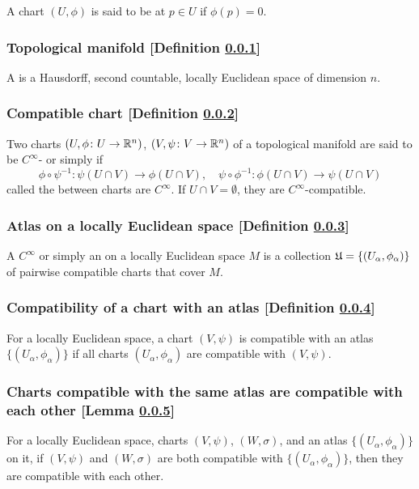 A chart $(U, \phi)$ is said to be  at $p \in U$ if $\phi(p) = 0$.

\subsubsection{Topological manifold [Definition \ref{topological-manifold}]}\label{topological-manifold}
A  is a Hausdorff, second countable, locally Euclidean space of dimension $n$.

\subsubsection{Compatible chart [Definition \ref{compatible-chart}]}\label{compatible-chart}
Two charts $(U, \phi \colon U \to \mathbb{R}^n)$, $(V, \psi \colon V \to \mathbb{R}^n)$ of a topological manifold are said to be $C^\infty$- or simply  if
\[
\phi \circ \psi^{-1} \colon \psi(U \cap V) \to \phi (U \cap V),\quad \psi \circ \phi^{-1} \colon \phi(U\cap V) \to \psi(U\cap V)
\]
called the  between charts are $C^\infty$. If $U \cap V = \emptyset$, they are $C^\infty$-compatible.

\subsubsection{Atlas on a locally Euclidean space [Definition \ref{atlas-on-a-locally-euclidean-space}]}\label{atlas-on-a-locally-euclidean-space}
A $C^\infty$  or simply an  on a locally Euclidean space $M$ is a collection $\mathfrak{U} = \{ (U_\alpha, \phi_\alpha) \}$ of pairwise compatible charts that cover $M$.

\subsubsection{Compatibility of a chart with an atlas [Definition \ref{compatibility-of-a-chart-with-an-atlas}]}\label{compatibility-of-a-chart-with-an-atlas}
For a locally Euclidean space, a chart $(V, \psi)$ is compatible with an atlas $\{(U_\alpha, \phi_\alpha)\}$ if all charts $(U_\alpha, \phi_\alpha)$ are compatible with $(V, \psi)$.

\subsubsection{Charts compatible with the same atlas are compatible with each other [Lemma \ref{charts-compatible-with-the-same-atlas-are-compatible-with-each-other}]}\label{charts-compatible-with-the-same-atlas-are-compatible-with-each-other}
For a locally Euclidean space, charts $(V, \psi)$, $(W, \sigma)$, and an atlas $\{( U_\alpha, \phi_\alpha)\}$ on it, if $(V, \psi)$ and $(W, \sigma)$ are both compatible with $\{(U_\alpha, \phi_\alpha)\}$, then they are compatible with each other.